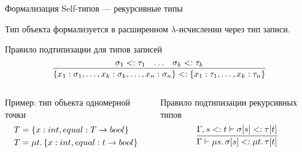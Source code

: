 \documentclass[aspectratio=169,usenames,dvipsnames]{beamer}
\begin{document}
    \begin{frame}[fragile]{Формализация Self-типов --- рекурсивные типы}

        Тип объекта формализуется в расширенном $\lambda$-исчислении через тип записи.
        \begin{block}{Правило подтипизации для типов записей}
            \[
                \infer{
                    \{x_1 : \sigma_1, \ldots, x_k : \sigma_k, \ldots, x_n : \sigma_n\}
                    <:
                    \{x_1 : \tau_1, \ldots, x_k : \tau_n\}
                }{\sigma_1 <: \tau_1 & \ldots & \sigma_k <: \tau_k}
            \]
        \end{block}

        \pause

        \vspace{-1em}
        \begin{columns}[onlytextwidth]
            \begin{column}[t]{0.485\textwidth}
                \begin{block}{Пример: тип объекта одномерной точки}
                    \vspace{-1.2em}
                    \begin{align*}
                        T &= \{ x : int, equal : T \to bool \} \\
                        T &= \mu t \ldotp \{ x : int, equal : t \to bool \}
                    \end{align*}
                \end{block}
            \end{column}\hfill%
            \begin{column}[t]{0.485\textwidth}
                \begin{block}{Правило подтипизации рекурсивных типов}
                    \begin{equation*}
                        \infer{
                            \Gamma \vdash \mu s\ldotp \sigma[s] <: \mu t\ldotp \tau[t]
                        }{
                            \Gamma, s <: t \vdash \sigma[s] <: \tau[t]
                        }
                    \end{equation*}
                \end{block}
            \end{column}
        \end{columns}

        \pause


\end{frame}
\end{document}
